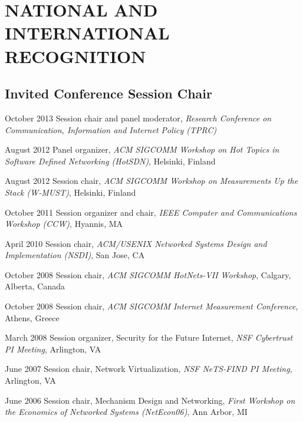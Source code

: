 
\section{NATIONAL AND INTERNATIONAL RECOGNITION}
\label{sec:national}

\subsection{Invited Conference Session Chair}
\label{subsec:invited}

\begin{cvlist}{}

\item[October 2013] Session chair and panel moderator, {\em Research
  Conference on Communication, Information and Internet Policy (TPRC)}

\item[August 2012] Panel organizer, {\em ACM SIGCOMM Workshop on Hot
  Topics in Software Defined Networking (HotSDN)}, Helsinki, Finland

\item[August 2012] Session chair, {\em ACM SIGCOMM Workshop on
  Measurements Up the Stack (W-MUST)}, Helsinki, Finland

\item[October 2011] Session organizer and chair, {\em IEEE Computer and
  Communications Workshop (CCW)}, Hyannis, MA

\item[April 2010] Session chair, {\em ACM/USENIX Networked Systems
  Design and Implementation (NSDI)}, San Jose, CA

\item[October 2008] Session chair, {\em ACM SIGCOMM HotNets-VII
  Workshop}, Calgary, Alberta, Canada

\item[October 2008] Session chair, {\em ACM SIGCOMM Internet Measurement
Conference}, Athens, Greece


\item[March 2008] Session organizer, Security for the Future Internet, {\em NSF
  Cybertrust PI Meeting}, Arlington, VA

\item[June 2007] Session chair, Network Virtualization, {\em NSF
  NeTS-FIND PI Meeting}, Arlington, VA

\item[June 2006] Session chair, Mechanism Design and Networking, {\em First
  Workshop on the Economics of Networked Systems (NetEcon06)}, Ann
  Arbor, MI
\end{cvlist}


